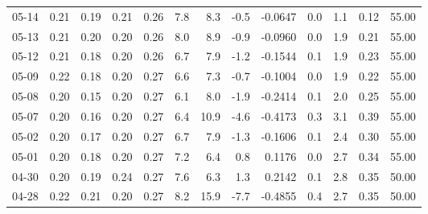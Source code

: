 \begin{threeparttable}
{\begin{tabular}{lrrrrrrrrrrrr}
  05-14 &          0.21 &          0.19 &          0.21 &        0.26 &                 7.8 &                 8.3 &       -0.5 &      -0.0647 &                 0.0 &              1.1 &            0.12 &                  55.00 \\
  05-13 &          0.21 &          0.20 &          0.20 &        0.26 &                 8.0 &                 8.9 &       -0.9 &      -0.0960 &                 0.0 &              1.9 &            0.21 &                  55.00 \\
  05-12 &          0.21 &          0.18 &          0.20 &        0.26 &                 6.7 &                 7.9 &       -1.2 &      -0.1544 &                 0.1 &              1.9 &            0.23 &                  55.00 \\
  05-09 &          0.22 &          0.18 &          0.20 &        0.27 &                 6.6 &                 7.3 &       -0.7 &      -0.1004 &                 0.0 &              1.9 &            0.22 &                  55.00 \\
  05-08 &          0.20 &          0.15 &          0.20 &        0.27 &                 6.1 &                 8.0 &       -1.9 &      -0.2414 &                 0.1 &              2.0 &            0.25 &                  55.00 \\
  05-07 &          0.20 &          0.16 &          0.20 &        0.27 &                 6.4 &                10.9 &       -4.6 &      -0.4173 &                 0.3 &              3.1 &            0.39 &                  55.00 \\
  05-02 &          0.20 &          0.17 &          0.20 &        0.27 &                 6.7 &                 7.9 &       -1.3 &      -0.1606 &                 0.1 &              2.4 &            0.30 &                  55.00 \\
  05-01 &          0.20 &          0.18 &          0.20 &        0.27 &                 7.2 &                 6.4 &        0.8 &       0.1176 &                 0.0 &              2.7 &            0.34 &                  55.00 \\
  04-30 &          0.20 &          0.19 &          0.24 &        0.27 &                 7.6 &                 6.3 &        1.3 &       0.2142 &                 0.1 &              2.8 &            0.35 &                  50.00 \\
  04-28 &          0.22 &          0.21 &          0.20 &        0.27 &                 8.2 &                15.9 &       -7.7 &      -0.4855 &                 0.4 &              2.7 &            0.35 &                  50.00 \\

\end{tabular}}
\end{threeparttable}
